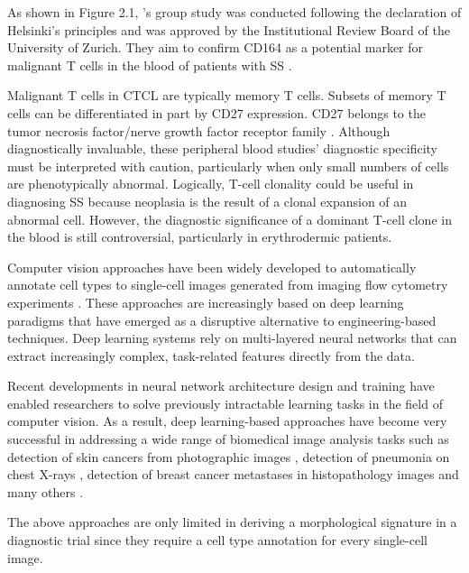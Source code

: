 As shown in Figure 2.1, \cite{emma}'s group study was conducted following the declaration of Helsinki's principles and was approved by the Institutional Review Board of the University of Zurich.  They aim to confirm CD164 as a potential marker for malignant T cells in the blood of patients with SS \cite{emma}.

Malignant T cells in CTCL are typically memory T cells. Subsets of memory T cells can be differentiated in part by CD27 expression\cite{nagler-31}\cite{nagler-33}. CD27 belongs to the tumor necrosis factor/nerve growth factor receptor family \cite{nagler}. Although diagnostically invaluable, these peripheral blood studies' diagnostic specificity must be interpreted with caution, particularly when only small numbers of cells are phenotypically abnormal\cite{nagler-6}. Logically, T-cell clonality could be useful in diagnosing SS because neoplasia is the result of a clonal expansion of an abnormal cell\cite{nagler}. However, the diagnostic significance of a dominant T-cell clone in the blood is still controversial, particularly in erythrodermic patients. 

Computer vision approaches have been widely developed to automatically annotate cell types to single-cell images generated from imaging flow cytometry experiments \cite{15}. These approaches are increasingly based on deep learning paradigms that have emerged as a disruptive alternative to engineering-based techniques. Deep learning systems rely on multi-layered neural networks that can extract increasingly complex, task-related features directly from the data. 

Recent developments in neural network architecture design and training have enabled researchers to solve previously intractable learning tasks in the field of computer vision. As a result, deep learning-based approaches have become very successful in addressing a wide range of biomedical image analysis tasks such as detection of skin cancers from photographic images \cite{10}, detection of pneumonia on chest X-rays \cite{13}, detection of breast cancer metastases in histopathology images and many others \cite{2}. 

The above approaches are only limited in deriving a morphological signature in a diagnostic trial since they require a cell type annotation for every single-cell image.

